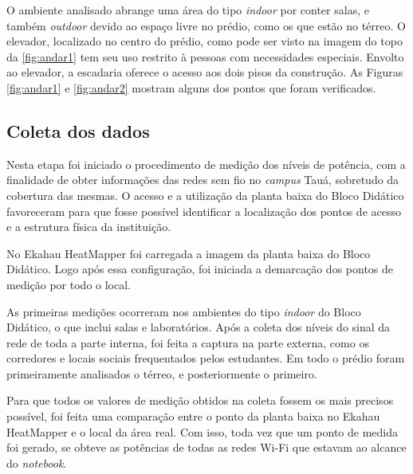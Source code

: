 O ambiente analisado abrange uma área do tipo \textit{indoor} por conter salas, e também \textit{outdoor} devido ao espaço livre no prédio, como os que estão no térreo. O elevador, localizado no centro do prédio, como pode ser visto na imagem do topo da \autoref{fig:andar1} tem seu uso restrito à pessoas com necessidades especiais. Envolto ao elevador, a escadaria oferece o acesso aos dois pisos da construção. As Figuras \ref{fig:andar1} e \ref{fig:andar2} mostram alguns dos pontos que foram verificados.

\begin{figure}[H]
	\centering
\end{figure}

\begin{figure}[H]
	\centering
\end{figure}

\subsection{Coleta dos dados}
\label{subsec:coleta-de-dados}

Nesta etapa foi iniciado o procedimento de medição dos níveis de potência, com a finalidade de obter informações das redes sem fio no \textit{campus} Tauá, sobretudo da cobertura das mesmas. O acesso e a utilização da planta baixa do Bloco Didático favoreceram para que fosse possível identificar a localização dos pontos de acesso e a estrutura física da instituição.

No Ekahau HeatMapper foi carregada a imagem da planta baixa do Bloco Didático. Logo após essa configuração, foi iniciada a demarcação dos pontos de medição por todo o local.

As primeiras medições ocorreram nos ambientes do tipo \textit{indoor} do Bloco Didático, o que inclui salas e laboratórios. Após a coleta dos níveis do sinal da rede de toda a parte interna, foi feita a captura na parte externa, como os corredores e locais sociais frequentados pelos estudantes. Em todo o prédio foram primeiramente analisados o térreo, e posteriormente o primeiro.

Para que todos os valores de medição obtidos na coleta fossem os mais precisos possível, foi feita uma comparação entre o ponto da planta baixa no Ekahau HeatMapper e o local da área real. Com isso, toda vez que um ponto de medida foi gerado, se obteve as potências de todas as redes Wi-Fi que estavam ao alcance do \textit{notebook}.

